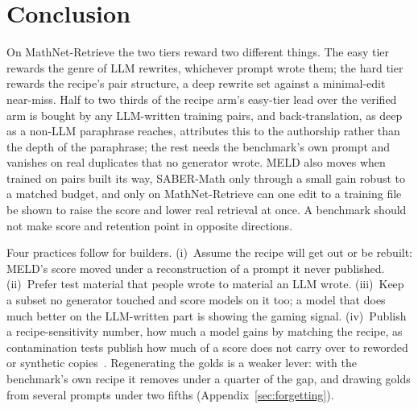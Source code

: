 \section{Conclusion}
\label{sec:conclusion}
On MathNet-Retrieve the two tiers reward two different things. The easy tier rewards the genre of LLM rewrites, whichever prompt wrote them; the hard tier rewards the recipe's pair structure, a deep rewrite set against a minimal-edit near-miss. Half to two thirds of the recipe arm's easy-tier lead over the verified arm is bought by any LLM-written training pairs, and back-translation, as deep as a non-LLM paraphrase reaches, attributes this to the authorship rather than the depth of the paraphrase; the rest needs the benchmark's own prompt and vanishes on real duplicates that no generator wrote. MELD also moves when trained on pairs built its way, SABER-Math only through a small gain robust to a matched budget, and only on MathNet-Retrieve can one edit to a training file be shown to raise the score and lower real retrieval at once. A benchmark should not make score and retention point in opposite directions.

Four practices follow for builders. (i)~Assume the recipe will get out or be rebuilt: MELD's score moved under a reconstruction of a prompt it never published. (ii)~Prefer test material that people wrote to material an LLM wrote. (iii)~Keep a subset no generator touched and score models on it too; a model that does much better on the LLM-written part is showing the gaming signal. (iv)~Publish a recipe-sensitivity number, how much a model gains by matching the recipe, as contamination tests publish how much of a score does not carry over to reworded or synthetic copies~\citep{dekoninck2024constat}. Regenerating the golds is a weaker lever: with the benchmark's own recipe it removes under a quarter of the gap, and drawing golds from several prompts under two fifths (Appendix~\ref{sec:forgetting}).
